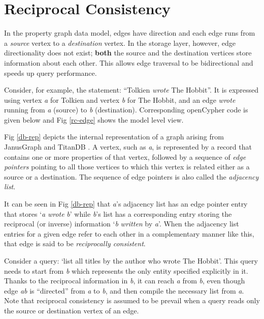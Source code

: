 \section{Reciprocal Consistency}
\label{sec:recipr-cons}

In the property graph data model, edges have direction and each edge runs from a \emph{source} vertex to a \emph{destination} vertex.
In the storage layer, however, edge directionality does not exist;  \textbf{both} the source and the destination vertices store information about each other.
This allows edge traversal to be bidirectional and speeds up query performance.

Consider, for example, the statement: ``Tolkien \textit{wrote} The Hobbit''.
It is expressed using vertex  \emph{a} for Tolkien and vertex \emph{b} for The Hobbit, and an edge \textit{wrote} running from \emph{a} (source) to \emph{b} (destination). Corresponding openCypher \cite{openCypher} code is given below and Fig \ref{rc-edge} shows the model level view.%


Fig \ref{db-rep} depicts the internal representation of a graph arising from JanusGraph \cite{janusgraph} and TitanDB \cite{TitanDB}.
A vertex, such as \emph{a}, is represented by a record that contains one or more properties of that vertex, followed by a sequence of \emph{edge pointers} pointing to all those vertices to which this vertex is related either as a source or a destination.
The sequence of edge pointers is also called the \emph{adjacency list}.

It can be seen in Fig \ref{db-rep} that \emph{a}'s adjacency list has an edge pointer entry that stores `\emph{a} \emph{wrote} \emph{b}' while \emph{b}'s list has a corresponding entry storing the reciprocal (or inverse) information `\emph{b} \emph{written} by \emph{a}'.
When the adjacency list entries for a given edge refer to each other in a complementary manner like this, that edge is said to be \emph{reciprocally consistent}.

Consider a query: `list all titles by the author who wrote The Hobbit'.
This query needs to start from \emph{b} which represents the only entity specified explicitly in it.
Thanks to the reciprocal information in \emph{b}, it can reach \emph{a} from \emph{b}, even though edge \emph{ab} is  ``directed'' from \emph{a} to \emph{b}, and then compile the necessary list from \emph{a}.
Note that reciprocal consistency is assumed to be prevail when a query reads only the source or destination vertex of an edge.

